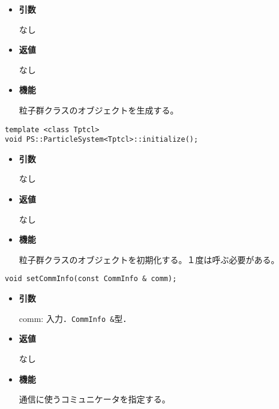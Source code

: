 \begin{itemize}

\item {\bf 引数}

なし

\item {\bf 返値}

なし

\item {\bf 機能}

粒子群クラスのオブジェクトを生成する。

\end{itemize}


\begin{screen}
\begin{verbatim}
template <class Tptcl>
void PS::ParticleSystem<Tptcl>::initialize();
\end{verbatim}
\end{screen}

\begin{itemize}

\item {\bf 引数}

なし

\item {\bf 返値}

なし

\item {\bf 機能}

粒子群クラスのオブジェクトを初期化する。１度は呼ぶ必要がある。


\end{itemize}


\begin{screen}
\begin{verbatim}
void setCommInfo(const CommInfo & comm);
\end{verbatim}
\end{screen}

\begin{itemize}

\item {\bf 引数}

comm: 入力．{\tt CommInfo \&}型．

\item {\bf 返値}

なし

\item {\bf 機能}

通信に使うコミュニケータを指定する。

\end{itemize}



